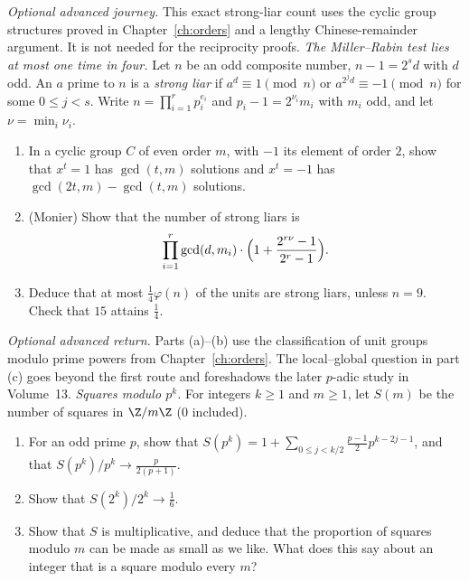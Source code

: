 \begin{exercise}[Journey]\label{pb:rabin}
\emph{Optional advanced journey.} This exact strong-liar count uses the
cyclic group structures proved in Chapter~\ref{ch:orders} and a lengthy
Chinese-remainder argument. It is not needed for the reciprocity proofs.
\emph{The Miller--Rabin test lies at most one time in four.} Let $n$ be an odd composite number, $n-1=2^sd$ with $d$ odd.
An $a$ prime to $n$ is a \emph{strong liar} if $a^d\equiv1\pmod n$ or $a^{2^jd}\equiv-1\pmod n$ for some $0\le j<s$. Write
$n=\prod_{i=1}^rp_i^{e_i}$ and $p_i-1=2^{\nu_i}m_i$ with $m_i$ odd, and let $\nu=\min_i\nu_i$.
\begin{enumerate}[label=(\alph*)]
\item In a cyclic group $C$ of even order $m$, with $-1$ its element of order $2$, show that $x^t=1$ has $\gcd(t,m)$
solutions and $x^t=-1$ has $\gcd(2t,m)-\gcd(t,m)$ solutions.
\item (Monier) Show that the number of strong liars is
\[
\prod_{i=1}^r\gcd(d,m_i)\cdot\Bigl(1+\frac{2^{r\nu}-1}{2^r-1}\Bigr).
\]
\item Deduce that at most $\frac14\varphi(n)$ of the units are strong liars, unless $n=9$. Check that $15$ attains $\frac14$.
\end{enumerate}
\end{exercise}



\begin{exercise}[$\star\star$]\label{pb:squaresmodpk}
\emph{Optional advanced return.} Parts (a)--(b) use the classification
of unit groups modulo prime powers from Chapter~\ref{ch:orders}.
The local--global question in part (c) goes beyond the first route
and foreshadows the later $p$-adic study in Volume~13.
\emph{Squares modulo $p^k$.} For integers $k\ge1$ and $m\ge1$, let $S(m)$ be the number of squares in $\Z/m\Z$ ($0$ included).
\begin{enumerate}[label=(\alph*)]
\item For an odd prime $p$, show that $S(p^k)=1+\sum_{0\le j<k/2}\frac{p-1}2p^{k-2j-1}$, and that $S(p^k)/p^k\to\frac p{2(p+1)}$.
\item Show that $S(2^k)/2^k\to\frac16$.
\item Show that $S$ is multiplicative, and deduce that the proportion of squares modulo $m$ can be made as small as we like.
What does this say about an integer that is a square modulo every $m$?
\end{enumerate}
\end{exercise}

